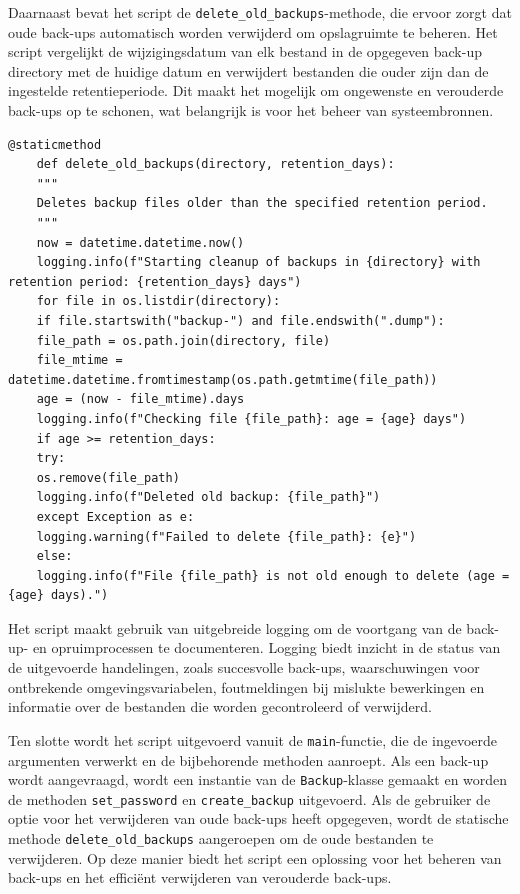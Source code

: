 Daarnaast bevat het script de \texttt{delete\_old\_backups}-methode, die ervoor zorgt dat oude back-ups automatisch worden verwijderd om opslagruimte te beheren. Het script vergelijkt de wijzigingsdatum van elk bestand in de opgegeven back-up directory met de huidige datum en verwijdert bestanden die ouder zijn dan de ingestelde retentieperiode. Dit maakt het mogelijk om ongewenste en verouderde back-ups op te schonen, wat belangrijk is voor het beheer van systeembronnen.
\begin{lstlisting}[language=script, caption={delete\_old\_backups-methode van het python-script.}]
    @staticmethod
    def delete_old_backups(directory, retention_days):
    """
    Deletes backup files older than the specified retention period.
    """
    now = datetime.datetime.now()
    logging.info(f"Starting cleanup of backups in {directory} with retention period: {retention_days} days")
    for file in os.listdir(directory):
    if file.startswith("backup-") and file.endswith(".dump"):
    file_path = os.path.join(directory, file)
    file_mtime = datetime.datetime.fromtimestamp(os.path.getmtime(file_path))
    age = (now - file_mtime).days
    logging.info(f"Checking file {file_path}: age = {age} days")
    if age >= retention_days:
    try:
    os.remove(file_path)
    logging.info(f"Deleted old backup: {file_path}")
    except Exception as e:
    logging.warning(f"Failed to delete {file_path}: {e}")
    else:
    logging.info(f"File {file_path} is not old enough to delete (age = {age} days).")
\end{lstlisting}

Het script maakt gebruik van uitgebreide logging om de voortgang van de back-up- en opruimprocessen te documenteren. Logging biedt inzicht in de status van de uitgevoerde handelingen, zoals succesvolle back-ups, waarschuwingen voor ontbrekende omgevingsvariabelen, foutmeldingen bij mislukte bewerkingen en informatie over de bestanden die worden gecontroleerd of verwijderd.

Ten slotte wordt het script uitgevoerd vanuit de \texttt{main}-functie, die de ingevoerde argumenten verwerkt en de bijbehorende methoden aanroept. Als een back-up wordt aangevraagd, wordt een instantie van de \texttt{Backup}-klasse gemaakt en worden de methoden \texttt{set\_password} en \texttt{create\_backup} uitgevoerd. Als de gebruiker de optie voor het verwijderen van oude back-ups heeft opgegeven, wordt de statische methode \texttt{delete\_old\_backups} aangeroepen om de oude bestanden te verwijderen. Op deze manier biedt het script een oplossing voor het beheren van back-ups en het efficiënt verwijderen van verouderde back-ups.

